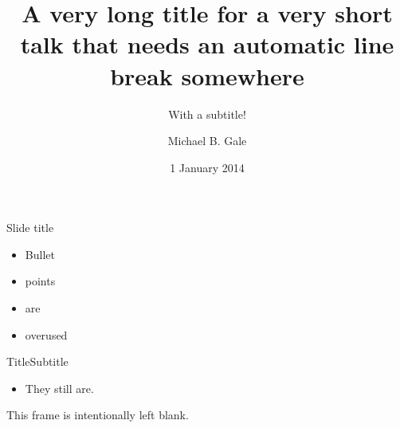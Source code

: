 \documentclass[aspectratio=1610]{beamer}
\title{A very long title for a very short talk that needs an automatic line break somewhere}
\subtitle{With a subtitle!}
\date{1 January 2014}
\author{Michael B. Gale}
\institute{Computer Laboratory, University of Cambridge}
\begin{document}
\begin{frame}
\maketitle
\end{frame}

\begin{frame}{Slide title}
\begin{itemize}
\item Bullet
\item points
\item are
\item overused
\end{itemize}
\end{frame}

\begin{frame}{Title}{Subtitle}
\begin{itemize}
\item They still are.
\end{itemize}
\end{frame}

\begin{frame}
\begin{center}
This frame is intentionally left blank.
\end{center}
\end{frame}
\end{document}
